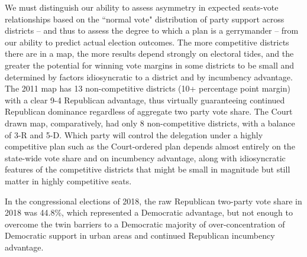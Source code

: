\par
	We must distinguish our ability to assess asymmetry in expected seats-vote relationships based on the ``normal vote" distribution of party support across districts -- and thus to assess the degree to which a plan is a gerrymander -- from our ability to predict actual election outcomes. The more competitive districts there are in a map, the more results depend strongly on electoral tides, and the greater the potential for winning vote margins in some districts to be small and determined by factors idiosyncratic to a district and by incumbency advantage. The 2011 map has 13 non-competitive districts (10+ percentage point margin) with a clear 9-4 Republican advantage, thus virtually guaranteeing continued Republican dominance regardless of aggregate two party vote share. The Court drawn map, comparatively, had only 8 non-competitive districts, with a balance of 3-R and 5-D. Which party will control the delegation under a highly competitive plan such as the Court-ordered plan depends almost entirely on the state-wide vote share and on incumbency advantage, along with idiosyncratic features of the competitive districts that might be small in magnitude but still matter in highly competitive seats. 
\par
	In the congressional elections of 2018, the raw Republican two-party vote share in 2018 was 44.8\%, which represented a Democratic advantage, but not enough to overcome the twin barriers to a Democratic majority of over-concentration of Democratic support in urban areas and continued Republican incumbency advantage.
